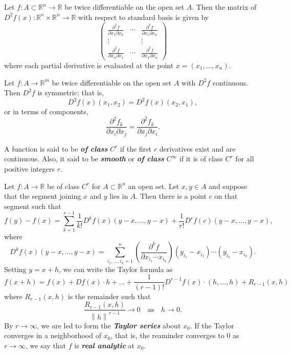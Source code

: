 \begin{mytheorem}
Let $f:A\subset \mathbb{R}^n\to \mathbb{R}$ be twice differentiable on the open set $A$. Then the matrix of $D^2f(x):\mathbb{R}^n\times \mathbb{R}^n\to \mathbb{R}$ with respect to standard basis is given by
\begingroup
\everymath{\displaystyle}
$$\begin{pmatrix}
\frac{\partial^2 f}{\partial x_1\partial x_2} & \cdots & \frac{\partial^2 f}{\partial x_1\partial x_n}\\
\vdots & & \vdots\\
\frac{\partial^2 f}{\partial x_n\partial x_1} & \cdots & \frac{\partial^2 f}{\partial x_n\partial x_n}
\end{pmatrix}$$
\endgroup
where each partial derivative is evaluated at the point $x=(x_1,\dots,x_n)$.
\end{mytheorem}

\begin{mytheorem}
Let $f:A\to \mathbb{R}^m$ be twice differentiable on the open set $A$ with $D^2f$ continuous.
Then $D^2f$ is symmetric; that is,
$$D^2f(x)(x_1,x_2)=D^2f(x)(x_2,x_1),$$
or in terms of components,
$$\frac{\partial^2 f_k}{\partial x_i\partial x_j}=\frac{\partial^2 f_k}{\partial x_j\partial x_i}.$$
\end{mytheorem}

\begin{mydefinition}
A function is said to be \textbf{\emph{of class}} $C^r$ if the first $r$ derivatives exist and are continuous. Also, it said to be \textbf{\emph{smooth}} or \textbf{\emph{of class}} $C^\infty$ if it is of class $C^r$ for all positive integers $r$.
\end{mydefinition}

\begin{mytheorem}
Let $f: A\to \mathbb{R}$ be of class $C^r$ for $A\subset \mathbb{R}^n$ an open set. Let $x,y\in A$ and suppose that the segment joining $x$ and $y$ lies in $A$. Then there is a point $c$ on that segment such that
$$f(y)-f(x)=\sum_{k=1}^{r-1}\frac{1}{k!}D^kf(x)(y-x,\dots,y-x)+\frac{1}{r!}D^rf(c)(y-x,\dots,y-x),$$
where 
$$D^kf(x)(y-x,\dots,y-x)=\sum_{i_1,\dots,i_k=1}^n\left(\frac{\partial^kf}{\partial x_{i_1}\cdots x_{i_k}}\right)(y_{i_1}-x_{i_1})\cdots (y_{i_k}-x_{i_k}).$$
Setting $y=x+h$, we can write the Taylor formula as
$$f(x+h)=f(x)+Df(x)\cdot h+\dots+\frac{1}{(r-1)!}D^{r-1}f(x)\cdot (h,\dots,h)+R_{r-1}(x,h)$$
where $R_{r-1}(x,h)$ is the remainder such that
$$\frac{R_{r-1}(x,h)}{\left\|h\right\|^{r-1}}\to 0\quad \text{as}\quad h\to 0.$$
By $r\to \infty$, we are led to form the \textbf{\emph{Taylor series}} about $x_0$.
If the Taylor converges in a neighborhood of $x_0$, that is, the reaminder converges to 0 as $r\to \infty$, we say that $f$ is \textbf{\emph{real analytic}} at $x_0$.
\end{mytheorem}


